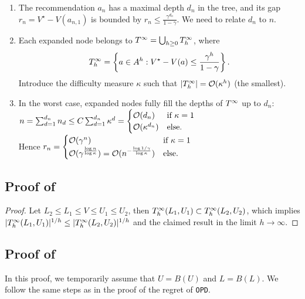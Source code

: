 \documentclass[runningheads]{llncs}
\begin{document}
\begin{enumerate}
	\item The recommendation $a_n$ has a maximal depth $d_n$ in the tree, and its gap $r_n = V^\star - V({a_{n,1}})$ is bounded by $r_n \leq \frac{\gamma^{d_n}}{1-\gamma}$. We need to relate $d_n$ to $n$.
	
	\item Each expanded node belongs to $T^\infty = \bigcup_{h\geq 0} T_h^\infty$, where $$T_h^\infty = \left\{a\in A^h: V^\star-V(a) \leq \frac{\gamma^h}{1-\gamma}\right\}.$$ Introduce the difficulty measure $\kappa$ such that $|T_h^\infty| = \mathcal{O}(\kappa^h)$ (the smallest).
	
	\item In the worst case, expanded nodes fully fill the depths of $T^\infty$ up to $d_n$: $n = \sum_{d=1}^{d_n} n_d \leq  C\sum_{d=1}^{d_n} \kappa^d = \begin{cases}
	\mathcal{O}(d_n) &\text{if $\kappa=1$}\\
	\mathcal{O}(\kappa^{d_n}) &\text{else.}
	\end{cases}$\\
	Hence $r_n = \begin{cases}
	\mathcal{O}(\gamma^n) &\text{if $\kappa=1$}\\
	\mathcal{O}(\gamma^{\frac{\log n}{\log \kappa}}) = \mathcal{O}(n^{-\frac{\log 1/\gamma}{\log \kappa}}) &\text{else.}
	\end{cases}$
\end{enumerate}

\subsection{Proof of }

\begin{proof}
Let $L_2\leq L_1\leq V\leq U_1\leq U_2$, then $T_h^\infty(L_1,U_1) \subset T_h^\infty(L_2,U_2)$, which implies $|T_h^\infty(L_1,U_1)|^{1/h} \leq |T_h^\infty(L_2,U_2)|^{1/h}$ and the claimed result in the limit $h\rightarrow\infty$.
\end{proof}

\subsection{Proof of }
In this proof, we temporarily assume that $U=B(U)$ and $L=B(L)$. We follow the same steps as in the proof of the regret of \texttt{OPD}.
\end{document}

